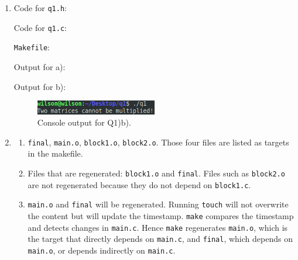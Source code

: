 \documentclass[11pt,letterpaper,titlepage]{article}
\begin{document}
\begin{enumerate}
    
    \item %
    
    Code for \verb|q1.h|:
    
    
    
    Code for \verb|q1.c|:
    
    
    
    \verb|Makefile|:
    
    
    
    Output for a):
    
    
    
    Output for b):
    
    \begin{figure}[ht]
        \centering
        \includegraphics[width=0.5\textwidth]{output.png}
        \caption{Console output for Q1)b).}
    \end{figure}
    
    \item %
    
    \begin{enumerate}
        
        \item \verb|final|, \verb|main.o|, \verb|block1.o|, \verb|block2.o|. Those four files are listed as targets in the makefile.
        
        \item Files that are regenerated: \verb|block1.o| and \verb|final|. Files such as \verb|block2.o| are not regenerated because they do not depend on \verb|block1.c|. 
        
        \item \verb|main.o| and \verb|final| will be regenerated. Running \verb|touch| will not overwrite the content but will update the timestamp. \verb|make| compares the timestamp and detects changes in \verb|main.c|. Hence \verb|make| regenerates \verb|main.o|, which is the target that directly depends on \verb|main.c|, and \verb|final|, which depends on \verb|main.o|, or depends indirectly on \verb|main.c|.
        
    \end{enumerate}
    

\end{enumerate}
\end{document}
